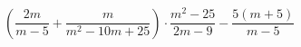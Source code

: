 \begin{ex}[type=expression]
	\begin{condition}
		\( \left( \dfrac{2m}{m-5}+\dfrac{m}{m^2-10m+25} \right) \cdot\dfrac{m^2-25}{2m-9}-\dfrac{5(m+5)}{m-5}\)
	\end{condition}
\end{ex}